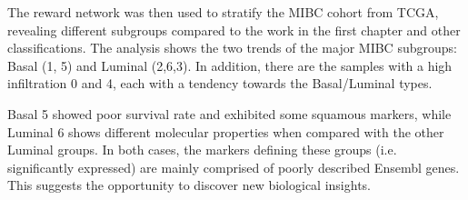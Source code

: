 The reward network was then used to stratify the MIBC cohort from TCGA, revealing different subgroups compared to the work in the first chapter and other classifications. The analysis shows the two trends of the major MIBC subgroups: Basal (1, 5) and Luminal (2,6,3). In addition, there are the samples with a high infiltration 0 and 4, each with a tendency towards the Basal/Luminal types. 


Basal 5 showed poor survival rate and exhibited some squamous markers, while Luminal 6 shows different molecular properties when compared with the other Luminal groups. In both cases, the markers defining these groups (i.e. significantly expressed) are mainly comprised of poorly described Ensembl genes. This suggests the opportunity to discover new biological insights.





